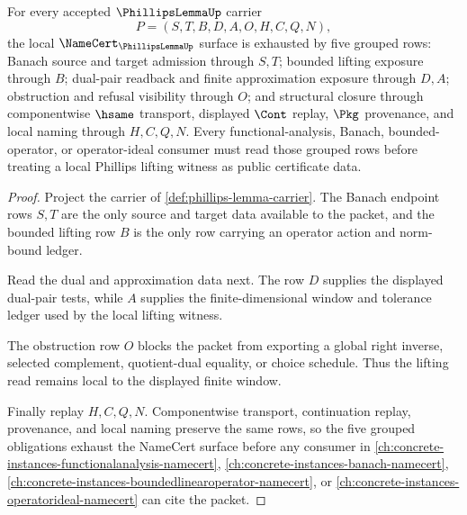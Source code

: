\begin{theorem}
\label{thm:phillips-lemma-namecert-obligations}
For every accepted $\PhillipsLemmaUp$ carrier
$$
P=(S,T,B,D,A,O,H,C,Q,N),
$$
the local $\NameCert_{\PhillipsLemmaUp}$ surface is exhausted by five grouped rows: Banach source and target admission through $S,T$; bounded lifting exposure through $B$; dual-pair readback and finite approximation exposure through $D,A$; obstruction and refusal visibility through $O$; and structural closure through componentwise $\hsame$ transport, displayed $\Cont$ replay, $\Pkg$ provenance, and local naming through $H,C,Q,N$. Every functional-analysis, Banach, bounded-operator, or operator-ideal consumer must read those grouped rows before treating a local Phillips lifting witness as public certificate data.
\end{theorem}
\begin{proof}
Project the carrier of \autoref{def:phillips-lemma-carrier}. The Banach endpoint rows $S,T$ are the only source and target data available to the packet, and the bounded lifting row $B$ is the only row carrying an operator action and norm-bound ledger.

Read the dual and approximation data next. The row $D$ supplies the displayed dual-pair tests, while $A$ supplies the finite-dimensional window and tolerance ledger used by the local lifting witness.

The obstruction row $O$ blocks the packet from exporting a global right inverse, selected complement, quotient-dual equality, or choice schedule. Thus the lifting read remains local to the displayed finite window.

Finally replay $H,C,Q,N$. Componentwise transport, continuation replay, provenance, and local naming preserve the same rows, so the five grouped obligations exhaust the NameCert surface before any consumer in \autoref{ch:concrete-instances-functionalanalysis-namecert}, \autoref{ch:concrete-instances-banach-namecert}, \autoref{ch:concrete-instances-boundedlinearoperator-namecert}, or \autoref{ch:concrete-instances-operatorideal-namecert} can cite the packet.
\end{proof}


